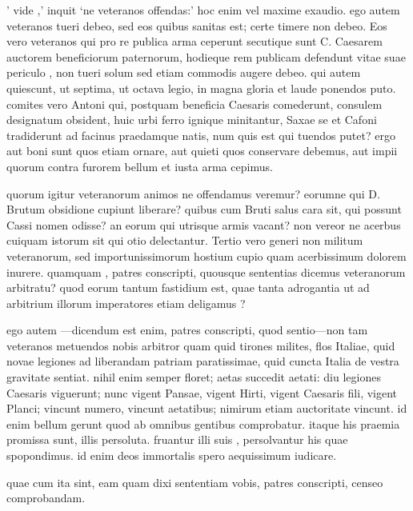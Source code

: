  ' vide ,' inquit `ne veteranos offendas:' hoc enim vel maxime exaudio. ego autem veteranos tueri debeo, sed eos quibus sanitas est; certe timere non debeo. Eos vero veteranos qui pro re publica arma ceperunt secutique sunt C. Caesarem auctorem beneficiorum paternorum, hodieque rem publicam defendunt vitae suae periculo , non tueri solum sed etiam commodis augere debeo. qui autem quiescunt, ut septima, ut octava legio, in magna gloria et laude ponendos puto. comites vero Antoni qui, postquam beneficia Caesaris comederunt, consulem designatum obsident, huic urbi ferro ignique minitantur, Saxae se et Cafoni tradiderunt ad facinus praedamque natis, num quis est qui tuendos putet? ergo aut boni sunt quos etiam ornare, aut quieti quos conservare debemus, aut impii quorum contra furorem bellum et iusta arma cepimus.

 quorum igitur veteranorum animos ne offendamus veremur? eorumne qui D. Brutum obsidione cupiunt liberare? quibus cum Bruti salus cara sit, qui possunt Cassi nomen odisse? an eorum qui utrisque armis vacant? non vereor ne acerbus cuiquam istorum sit qui otio delectantur. Tertio vero generi non militum veteranorum, sed importunissimorum hostium cupio quam acerbissimum dolorem inurere. quamquam , patres conscripti, quousque sententias dicemus veteranorum arbitratu? quod eorum tantum fastidium est, quae tanta adrogantia ut ad arbitrium illorum imperatores etiam deligamus ?

 ego autem —dicendum est enim, patres conscripti, quod sentio—non tam veteranos metuendos nobis arbitror quam quid tirones milites, flos Italiae, quid novae legiones ad liberandam patriam paratissimae, quid cuncta Italia de vestra gravitate sentiat. nihil enim semper floret; aetas succedit aetati: diu legiones Caesaris viguerunt; nunc vigent Pansae, vigent Hirti, vigent Caesaris fili, vigent Planci; vincunt numero, vincunt aetatibus; nimirum etiam auctoritate vincunt. id enim bellum gerunt quod ab omnibus gentibus comprobatur. itaque his praemia promissa sunt, illis persoluta. fruantur illi suis , persolvantur his quae spopondimus. id enim deos immortalis spero aequissimum iudicare.

 quae cum ita sint, eam quam dixi sententiam vobis, patres conscripti, censeo comprobandam.
